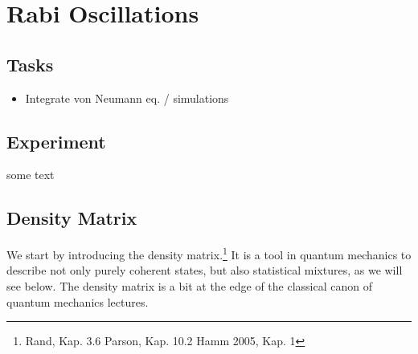 

\chapter{Rabi Oscillations}



\section{Tasks}

\begin{itemize}
\item  Integrate von Neumann eq. / simulations
\end{itemize}



\section{Experiment}

some text


\section{Density Matrix}


We start by introducing the density matrix.\footnote{Rand,  Kap. 3.6 \newline Parson, Kap. 10.2 \newline Hamm 2005, Kap. 1} It is a tool in quantum mechanics to describe not only purely coherent states, but also statistical mixtures, as we will see below. The density matrix is a bit at the edge of the classical canon of quantum mechanics lectures.

